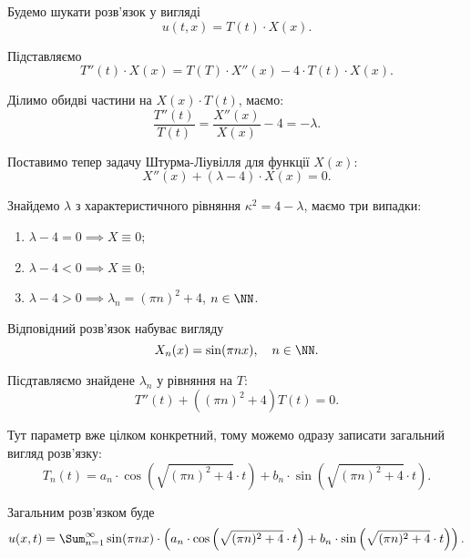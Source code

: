 \begin{solution}
	Будемо шукати розв'язок у вигляді
	\begin{equation*}
		u(t, x) = T(t) \cdot X(x).
	\end{equation*}

	Підставляємо
	\begin{equation*}
		T''(t) \cdot X(x) = T(T) \cdot X''(x) - 4 \cdot T(t) \cdot X(x).
	\end{equation*}
	
	Ділимо обидві частини на $X(x) \cdot T(t)$, маємо:
	\begin{equation*}
		\frac{T''(t)}{T(t)} = \frac{X''(x)}{X(x)} - 4 = - \lambda.
	\end{equation*}
	
	Поставимо тепер задачу Штурма-Ліувілля для функції $X(x)$:
	\begin{equation*}
		X''(x) + (\lambda - 4) \cdot X(x) = 0.
	\end{equation*}

	Знайдемо $\lambda$ з характеристичного рівняння $\kappa^2 = 4 - \lambda$, маємо три випадки:
	\begin{enumerate}
		\item $\lambda - 4 = 0 \implies X \equiv 0$;
		\item $\lambda - 4 < 0 \implies X \equiv 0$;
		\item $\lambda - 4 > 0 \implies \lambda_n = (\pi n)^2 + 4$, $n \in \NN$.
	\end{enumerate}

	Відповідний розв'язок набуває вигляду
	\begin{equation*}
		X_n(x) = \sin (\pi n x), \quad n \in \NN.
	\end{equation*}

	Пісдтавляємо знайдене $\lambda_n$ у рівняння на $T$:
	\begin{equation*}
		T''(t) + ((\pi n)^2 + 4) T(t) = 0.
	\end{equation*}

	Тут параметр вже цілком конкретний, тому можемо одразу записати загальний вигляд розв'язку:
	\begin{equation*}
		T_n(t) = a_n \cdot \cos \left( \sqrt{(\pi n)^2 + 4} \cdot t \right) + b_n \cdot \sin \left( \sqrt{(\pi n)^2 + 4} \cdot t \right).
	\end{equation*}

	Загальним розв'язком буде
	\begin{equation*}
		u(x, t) = \Sum_{n = 1}^\infty \sin(\pi n x) \cdot \left( a_n \cdot \cos \left( \sqrt{(\pi n)^2 + 4} \cdot t \right) + b_n \cdot \sin \left( \sqrt{(\pi n)^2 + 4} \cdot t \right) \right).
	\end{equation*}


\end{solution}
